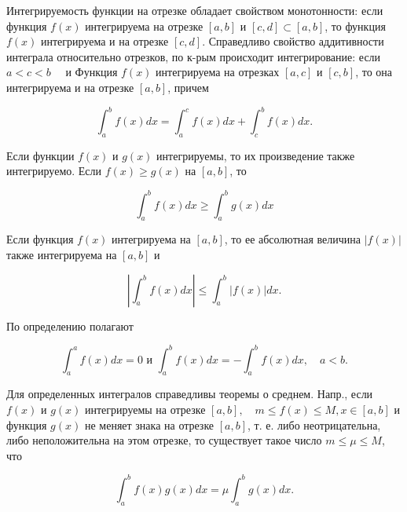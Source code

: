 \documentclass[10pt]{article}
\begin{document}
Интегрируемость функции на отрезке обладает свойством монотонности: если функция $f(x)$ интегрируема на отрезке $[a, b]$ и $[c, d] \subset[a, b]$, то функция $f(x)$ интегрируема и на отрезке $[c, d]$. Справедливо свойство аддитивности интеграла относительно отрезков, по к-рым происходит интегрирование: если $a<c<b \quad$ и Функция $f(x)$ интегрируема на отрезках $[a, c]$ и $[c, b]$, то она интегрируема и на отрезке $[a, b]$, причем



\[

\int_{a}^{b} f(x) d x=\int_{a}^{c} f(x) d x+\int_{c}^{b} f(x) d x .

\]



Если функции $f(x)$ и $g(x)$ интегрируемы, то их произведение также интегрируемо. Если $f(x) \geqslant g(x)$ на $[a, b]$, то



\[

\int_{a}^{b} f(x) d x \geqslant \int_{a}^{b} g(x) d x

\]



Если функция $f(x)$ интегрируема на $[a, b]$, то ее абсолютная величина $|f(x)|$ также интегрируема на $[a, b]$ и



\[

\left|\int_{a}^{b} f(x) d x\right| \leqslant \int_{a}^{b}|f(x)| d x .

\]



По определению полагают



\[

\int_{a}^{a} f(x) d x=0 \text { и } \int_{a}^{b} f(x) d x=-\int_{a}^{b} f(x) d x, \quad a<b .

\]



Для определенных интегралов справедливы теоремы о среднем. Напр., если $f(x)$ и $g(x)$ интегрируемы на отрезке $[a, b], \quad m \leqslant f(x) \leqslant M, x \in[a, b]$ и функция $g(x)$ не меняет знака на отрезке $[a, b]$, т. е. либо неотрицательна, либо неположительна на этом отрезке, то существует такое число $m \leqslant \mu \leqslant M$, что



\[

\int_{a}^{b} f(x) g(x) d x=\mu \int_{a}^{b} g(x) d x .

\]
\end{document}
